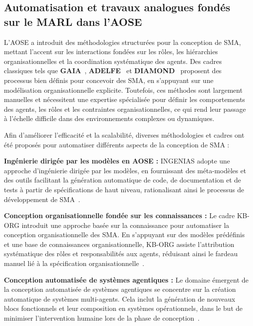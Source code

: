 \documentclass[pdflatex,sn-mathphys-num]{sn-jnl}%
\theoremstyle{thmstyleone}%
\theoremstyle{thmstyletwo}%
\theoremstyle{thmstylethree}%
\begin{document}
\subsection{Automatisation et travaux analogues fondés sur le MARL dans l’AOSE}\label{sub-sec:rel_aose_automate_marl}

L’AOSE a introduit des méthodologies structurées pour la conception de SMA, mettant l’accent sur les interactions fondées sur les rôles, les hiérarchies organisationnelles et la coordination systématique des agents. Des cadres classiques tels que \textbf{GAIA}~\cite{gaia1998}, \textbf{ADELFE}~\cite{adelfe2002} et \textbf{DIAMOND}~\cite{Jamont2005} proposent des processus bien définis pour concevoir des SMA, en s’appuyant sur une modélisation organisationnelle explicite. Toutefois, ces méthodes sont largement manuelles et nécessitent une expertise spécialisée pour définir les comportements des agents, les rôles et les contraintes organisationnelles, ce qui rend leur passage à l’échelle difficile dans des environnements complexes ou dynamiques.

Afin d’améliorer l’efficacité et la scalabilité, diverses méthodologies et cadres ont été proposés pour automatiser différents aspects de la conception de SMA :

\textbf{Ingénierie dirigée par les modèles en AOSE :} INGENIAS adopte une approche d’ingénierie dirigée par les modèles, en fournissant des méta-modèles et des outils facilitant la génération automatique de code, de documentation et de tests à partir de spécifications de haut niveau, rationalisant ainsi le processus de développement de SMA~\cite{pavon2005agent}.

\textbf{Conception organisationnelle fondée sur les connaissances :} Le cadre KB-ORG introduit une approche basée sur la connaissance pour automatiser la conception organisationnelle des SMA. En s’appuyant sur des modèles prédéfinis et une base de connaissances organisationnelle, KB-ORG assiste l’attribution systématique des rôles et responsabilités aux agents, réduisant ainsi le fardeau manuel lié à la spécification organisationnelle~\cite{dignum2001kb}.

\textbf{Conception automatisée de systèmes agentiques :} Le domaine émergent de la conception automatisée de systèmes agentiques se concentre sur la création automatique de systèmes multi-agents. Cela inclut la génération de nouveaux blocs fonctionnels et leur composition en systèmes opérationnels, dans le but de minimiser l’intervention humaine lors de la phase de conception~\cite{smith2024automated}.
\end{document}
